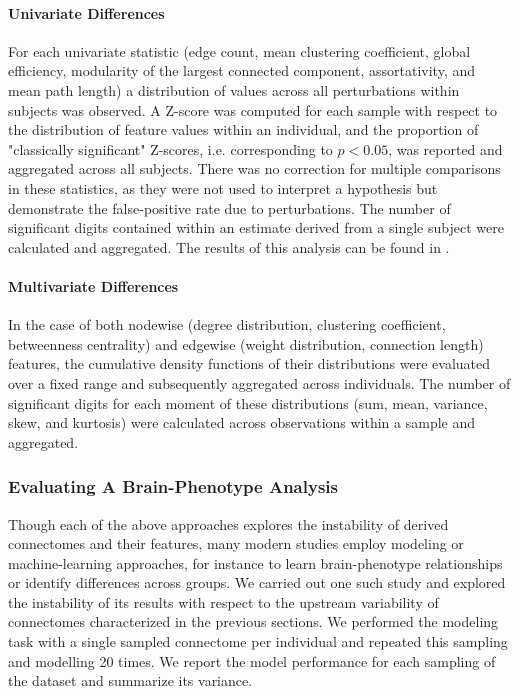 \documentclass[fleqn,10pt]{SelfArx} %
\newcommand{\new}[1]{{#1}}
\begin{document}
\paragraph{Univariate Differences} For each univariate statistic (edge count, mean clustering coefficient, global
efficiency, modularity of the largest connected component, assortativity, and mean path length) a distribution of
values across all perturbations within subjects was observed. A Z-score was computed for each sample with respect to
the distribution of feature values within an individual, and the proportion of "classically significant" Z-scores, i.e.
corresponding to $p < 0.05$, was reported and aggregated across all subjects. \new{There was no correction for multiple
comparisons in these statistics, as they were not used to interpret a hypothesis but demonstrate the false-positive
rate due to perturbations.} The number of significant digits
contained within an estimate derived from a single subject were calculated and aggregated. \new{The results of this
analysis can be found in \sref{supsec:univar}}.

\paragraph{Multivariate Differences} In the case of both nodewise (degree distribution, clustering coefficient,
betweenness centrality) and edgewise (weight distribution, connection length) features, the cumulative density
functions of their distributions were evaluated over a fixed range and subsequently aggregated across individuals. The
number of significant digits for each moment of these distributions (sum, mean, variance, skew, and kurtosis) were
calculated across observations within a sample and aggregated.

\subsubsection*{Evaluating A Brain-Phenotype Analysis}
Though each of the above approaches explores the instability of derived connectomes and their features, many modern
studies employ modeling or machine-learning approaches, for instance to learn brain-phenotype relationships or identify
differences across groups. We carried out one such study and explored the instability of its results with respect to
the upstream variability of connectomes characterized in the previous sections. We performed the modeling task with a
single sampled connectome per individual and repeated this sampling and modelling 20 times. We report the model
performance for each sampling of the dataset and summarize its variance.
\end{document}
